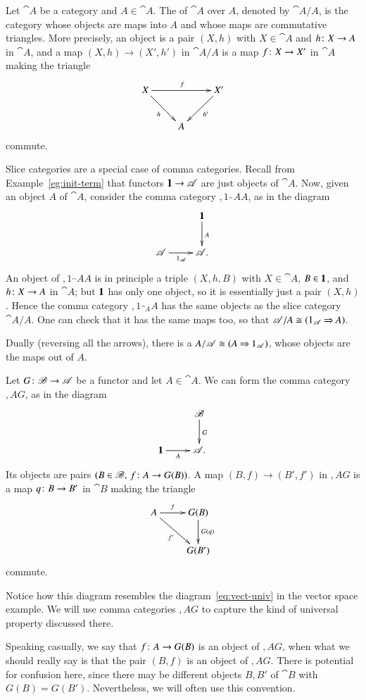 \begin{example}
Let $\cat{A}$ be a category and $A \in \cat{A}$.  The  of $\cat{A}$ over $A$, denoted by $\cat{A}/A$,%
%
%
is the category whose objects are maps into $A$ and whose maps are
commutative triangles.  More precisely, an object is a pair $(X, h)$ with
$X \in \cat{A}$ and $h\from X \to A$ in $\cat{A}$, and a map $(X, h) \to
(X', h')$ in $\cat{A}/A$ is a map $f\from X \to X'$ in $\cat{A}$ making the
triangle
\[
\xymatrix{
X \ar[rr]^f \ar[rd]_h   &       &X' \ar[ld]^{h'}     \\
                        &A
}
\]
commute.

Slice categories are a special case of comma categories.  Recall from
Example~\ref{eg:init-term} that functors $\mathbf{1} \to \mathscr{A}$ are just
objects of $\cat{A}$.  Now, given an object $A$ of $\cat{A}$, consider the
comma category $\comma{1_\cat{A}}{A}$, as in the diagram
\[
\xymatrix{
        &\One \ar[d]^A       \\
\cat{A} \ar[r]_{1_\cat{A}}      &
\cat{A}.
}
\]
An object of $\comma{1_\cat{A}}{A}$ is in principle a triple $(X, h, B)$
with $X \in \cat{A}$, $B \in \mathbf{1}$, and $h\from X \to A$ in $\cat{A}$; but
$\mathbf{1}$ has only one object, so it is essentially just a pair $(X, h)$.
Hence the comma category $\comma{1_{\cat{A}}}{A}$ has the same objects as
the slice category $\cat{A}/A$.  One can check that it has the same maps
too, so that $\mathscr{A}/A \cong (1_{\mathscr{A}} \mathbin{\Rightarrow} A)$.

Dually (reversing all the arrows), there is a  $A/\mathscr{A} \cong (A \mathbin{\Rightarrow} 1_{\mathscr{A}})$,%
%
%
 whose objects are the maps out of
$A$.
\end{example}

\begin{example}
\label{eg:comma-obj-ftr}
Let $G\from \cat{B} \to \cat{A}$ be a functor and let $A \in \cat{A}$.  We
can form the comma category $\comma{A}{G}$,%
%
%
 as in the diagram
\[
\xymatrix{
        &\cat{B} \ar[d]^G       \\
\One \ar[r]_-A           &
\cat{A}.
}
\]
Its objects are pairs $(B \in \cat{B},\, f\from A \to G(B))$.  A map $(B,
f) \to (B', f')$ in $\comma{A}{G}$ is a map $q\from B \to B'$ in $\cat{B}$
making the triangle
\[
\xymatrix{
A \ar[r]^-f \ar[rd]_{f'}         &G(B) \ar[d]^{G(q)}     \\
                                &G(B')
}
\]
commute.

Notice how this diagram resembles the diagram~\eqref{eq:vect-univ} in the
vector space example.  We will use comma categories $\comma{A}{G}$ to
capture the kind of universal property discussed there.

Speaking casually, we say that $f\from A \to G(B)$ is an object of
$\comma{A}{G}$, when what we should really say is that the pair $(B, f)$ is
an object of $\comma{A}{G}$.  There is potential for confusion here, since
there may be different objects $B, B'$ of $\cat{B}$ with $G(B) = G(B')$.
Nevertheless, we will often use this convention.
\end{example}

